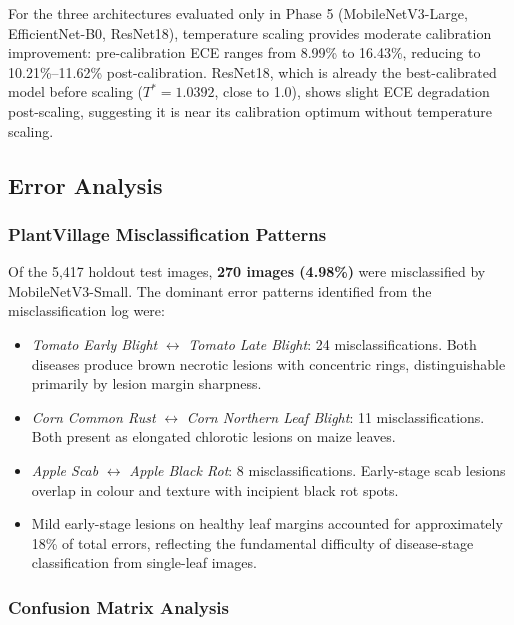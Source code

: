 \documentclass[pdflatex,sn-mathphys-num]{sn-jnl}
\theoremstyle{thmstyleone}%
\theoremstyle{thmstyletwo}%
\theoremstyle{thmstylethree}%
\begin{document}
For the three architectures evaluated only in Phase 5 (MobileNetV3-Large, EfficientNet-B0,
ResNet18), temperature scaling provides moderate calibration improvement: pre-calibration
ECE ranges from 8.99\% to 16.43\%, reducing to 10.21\%--11.62\% post-calibration.
ResNet18, which is already the best-calibrated model before scaling ($T^* = 1.0392$,
close to 1.0), shows slight ECE degradation post-scaling, suggesting it is near its
calibration optimum without temperature scaling.

\subsection{Error Analysis}
\label{sec:error_analysis}

\subsubsection{PlantVillage Misclassification Patterns}

Of the 5{,}417 holdout test images, \textbf{270 images (4.98\%)} were misclassified
by MobileNetV3-Small. The dominant error patterns identified from the misclassification
log were:
\begin{itemize}
  \item \textit{Tomato Early Blight} $\leftrightarrow$ \textit{Tomato Late Blight}:
        24 misclassifications. Both diseases produce brown necrotic lesions with
        concentric rings, distinguishable primarily by lesion margin sharpness.
  \item \textit{Corn Common Rust} $\leftrightarrow$ \textit{Corn Northern Leaf Blight}:
        11 misclassifications. Both present as elongated chlorotic lesions on maize leaves.
  \item \textit{Apple Scab} $\leftrightarrow$ \textit{Apple Black Rot}:
        8 misclassifications. Early-stage scab lesions overlap in colour and texture
        with incipient black rot spots.
  \item Mild early-stage lesions on healthy leaf margins accounted for approximately
        18\% of total errors, reflecting the fundamental difficulty of disease-stage
        classification from single-leaf images.
\end{itemize}

\subsubsection{Confusion Matrix Analysis}
\end{document}
